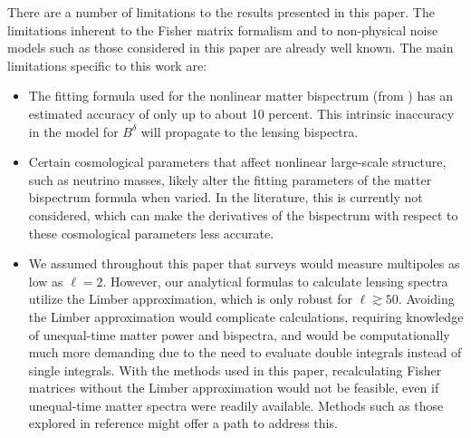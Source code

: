 \documentclass[11pt]{article} %
\begin{document}
There are a number of limitations to the results presented in this paper. The limitations inherent to the Fisher matrix formalism and to non-physical noise models such as those considered in this paper are already well known. The main limitations specific to this work are:
\begin{itemize}
     \item The fitting formula used for the nonlinear matter bispectrum (from \cite{bispfit}) has an estimated accuracy of only up to about 10 percent. This intrinsic inaccuracy in the model for $B^{\delta}$ will propagate to the lensing bispectra.
     
     \item Certain cosmological parameters that affect nonlinear large-scale structure, such as neutrino masses, likely alter the fitting parameters of the matter bispectrum formula when varied. In the literature, this is currently not considered, which can make the derivatives of the bispectrum with respect to these cosmological parameters less accurate.
     
     \item We assumed throughout this paper that surveys would measure multipoles as low as $\ell = 2$.  However, our analytical formulas to calculate lensing spectra utilize the Limber approximation, which is only robust for $\ell \gtrsim 50$. Avoiding the Limber approximation would complicate calculations, requiring knowledge of unequal-time matter power and bispectra, and would be computationally much more demanding due to the need to evaluate double integrals instead of single integrals. With the methods used in this paper, recalculating Fisher matrices without the Limber approximation would not be feasible, even if unequal-time matter spectra were readily available. Methods such as those explored in reference \cite{Chen:2021vba} might offer a path to address this.


\end{itemize}
\end{document}
